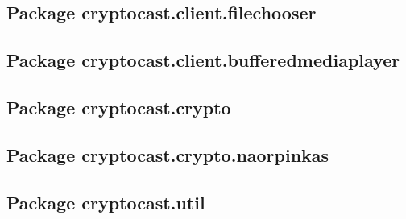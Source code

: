 \documentclass[a4paper,10pt]{scrartcl}
\begin{document}
	
\subsection{Package cryptocast.client.filechooser}
\subsection{Package cryptocast.client.bufferedmediaplayer}
\subsection{Package cryptocast.crypto}
\subsection{Package cryptocast.crypto.naorpinkas}
\subsection{Package cryptocast.util}
\end{document}
